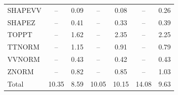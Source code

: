 \begin{table}[H]
\begin{center}
\begin{footnotesize}
\begin{tabular}{lcccccc}
				SHAPEVV & -- &  0.09 & -- &  0.08 & -- &  0.26 \\
				SHAPEZ & -- &  0.41 & -- &  0.33 & -- &  0.39 \\
				TOPPT & -- &  1.62 & -- &  2.35 & -- &  2.25 \\
				TTNORM & -- &  1.15 & -- &  0.91 & -- &  0.79 \\
				VVNORM & -- &  0.43 & -- &  0.42 & -- &  0.43 \\
				ZNORM & -- &  0.82 & -- &  0.85 & -- &  1.03 \\
				Total &  10.35  &  8.59 &  10.05  &  10.15 &  14.08  &  9.63 \\ \hline \hline
			\end{tabular}
			\label{tab:SysUncertainties_1000}
        \end{footnotesize}
	\end{center}
\end{table}


